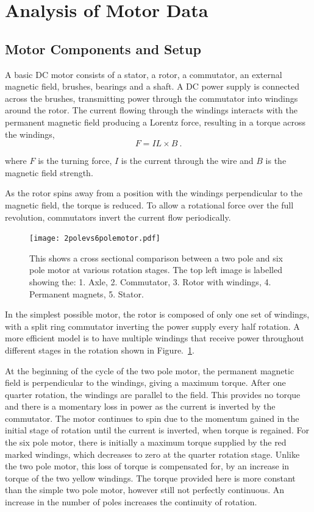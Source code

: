 \section{Analysis of Motor Data}
\label{sec:analysis}

\subsection{Motor Components and Setup}

A basic DC motor consists of a stator, a rotor, a commutator, an external magnetic field, brushes, bearings and a shaft. A DC power supply is connected across the brushes, transmitting power through the commutator into windings around the rotor. The current flowing through the windings interacts with the permanent magnetic field producing a Lorentz force, resulting in a torque across the windings,
\begin{equation}
    F = I L \times B~.
    \label{Lorentz}
\end{equation}

where $F$ is the turning force, $I$ is the current through the wire and $B$ is the magnetic field strength.

As the rotor spins away from a position with the windings perpendicular to the magnetic field, the torque is reduced. To allow a rotational force over the full revolution, commutators invert the current flow periodically. 

\begin{figure}
    \centering
    \texttt{[image: 2polevs6polemotor.pdf]}
    \caption[DC motor cross sectional comparison]{This shows a cross sectional comparison between a two pole and six pole motor at various rotation stages. The top left image is labelled showing the: 1. Axle, 2. Commutator, 3. Rotor with windings, 4. Permanent magnets, 5. Stator.}
    \label{fig:2pole_vs_6pole}
\end{figure}

In the simplest possible motor, the rotor is composed of only one set of windings, with a split ring commutator inverting the power supply every half rotation. A more efficient model is to have multiple windings that receive power throughout different stages in the rotation shown in Figure.~\ref{fig:2pole_vs_6pole}. 

At the beginning of the cycle of the two pole motor, the permanent magnetic field is perpendicular to the windings, giving a maximum torque. After one quarter rotation, the windings are parallel to the field. This provides no torque and there is a momentary loss in power as the current is inverted by the commutator. The motor continues to spin due to the momentum gained in the initial stage of rotation until the current is inverted, when torque is regained. For the six pole motor, there is initially a maximum torque supplied by the red marked windings, which decreases to zero at the quarter rotation stage. Unlike the two pole motor, this loss of torque is compensated for, by an increase in torque of the two yellow windings. The torque provided here is more constant than the simple two pole motor, however still not perfectly continuous. An increase in the number of poles increases the continuity of rotation.

